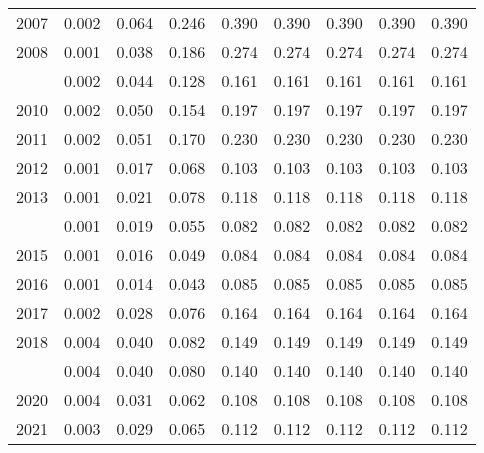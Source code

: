 \documentclass[
]{article}
\begin{document}
\begin{longtable}[t]{lrrrrrrrr}
2007 & 0.002 & 0.064 & 0.246 & 0.390 & 0.390 & 0.390 & 0.390 & 0.390\\
2008 & 0.001 & 0.038 & 0.186 & 0.274 & 0.274 & 0.274 & 0.274 & 0.274\\
\addlinespace
2009 & 0.002 & 0.044 & 0.128 & 0.161 & 0.161 & 0.161 & 0.161 & 0.161\\
2010 & 0.002 & 0.050 & 0.154 & 0.197 & 0.197 & 0.197 & 0.197 & 0.197\\
2011 & 0.002 & 0.051 & 0.170 & 0.230 & 0.230 & 0.230 & 0.230 & 0.230\\
2012 & 0.001 & 0.017 & 0.068 & 0.103 & 0.103 & 0.103 & 0.103 & 0.103\\
2013 & 0.001 & 0.021 & 0.078 & 0.118 & 0.118 & 0.118 & 0.118 & 0.118\\
\addlinespace
2014 & 0.001 & 0.019 & 0.055 & 0.082 & 0.082 & 0.082 & 0.082 & 0.082\\
2015 & 0.001 & 0.016 & 0.049 & 0.084 & 0.084 & 0.084 & 0.084 & 0.084\\
2016 & 0.001 & 0.014 & 0.043 & 0.085 & 0.085 & 0.085 & 0.085 & 0.085\\
2017 & 0.002 & 0.028 & 0.076 & 0.164 & 0.164 & 0.164 & 0.164 & 0.164\\
2018 & 0.004 & 0.040 & 0.082 & 0.149 & 0.149 & 0.149 & 0.149 & 0.149\\
\addlinespace
2019 & 0.004 & 0.040 & 0.080 & 0.140 & 0.140 & 0.140 & 0.140 & 0.140\\
2020 & 0.004 & 0.031 & 0.062 & 0.108 & 0.108 & 0.108 & 0.108 & 0.108\\
2021 & 0.003 & 0.029 & 0.065 & 0.112 & 0.112 & 0.112 & 0.112 & 0.112\\*
\end{longtable}
\end{document}
